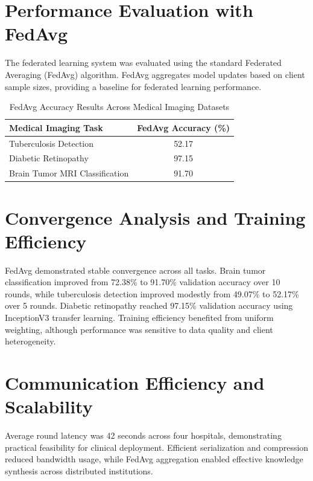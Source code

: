 \section{Performance Evaluation with FedAvg}
\label{sec:fedavg_eval}

The federated learning system was evaluated using the standard Federated Averaging (FedAvg) algorithm. FedAvg aggregates model updates based on client sample sizes, providing a baseline for federated learning performance.

\begin{table}[!ht]
\centering
\caption{FedAvg Accuracy Results Across Medical Imaging Datasets}
\label{tab:accuracy_comparison}
\begin{tabular}{|l|c|}
\hline
\textbf{Medical Imaging Task} & \textbf{FedAvg Accuracy (\%)} \\
\hline
Tuberculosis Detection & 52.17 \\
Diabetic Retinopathy & 97.15 \\
Brain Tumor MRI Classification & 91.70 \\
\hline
\end{tabular}
\end{table}

\section{Convergence Analysis and Training Efficiency}
\label{sec:convergence}

FedAvg demonstrated stable convergence across all tasks. Brain tumor classification improved from 72.38\% to 91.70\% validation accuracy over 10 rounds, while tuberculosis detection improved modestly from 49.07\% to 52.17\% over 5 rounds. Diabetic retinopathy reached 97.15\% validation accuracy using InceptionV3 transfer learning. Training efficiency benefited from uniform weighting, although performance was sensitive to data quality and client heterogeneity.

\section{Communication Efficiency and Scalability}
\label{sec:communication}

Average round latency was 42 seconds across four hospitals, demonstrating practical feasibility for clinical deployment. Efficient serialization and compression reduced bandwidth usage, while FedAvg aggregation enabled effective knowledge synthesis across distributed institutions.

